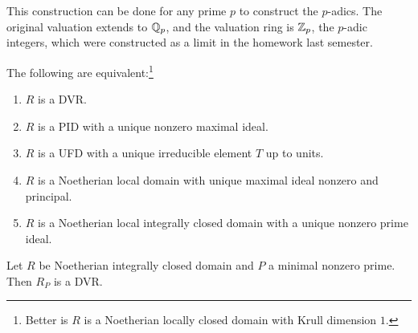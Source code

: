 \documentclass[10pt, twoside]{article}
\begin{document}
        \begin{rmk}
            This construction can be done for any prime $p$ to construct the $p$-adics. The original valuation extends to $\mathbb{Q}_p$, and the valuation ring is $\mathbb{Z}_p$, the $p$-adic integers, which were constructed as a limit in the homework last semester.
        \end{rmk}

        \begin{thm}
            The following are equivalent:\footnote{Better is $R$ is a Noetherian locally closed domain with Krull dimension $1$.}
            \begin{enumerate}
                \item $R$ is a DVR.
                \item $R$ is a PID with a unique nonzero maximal ideal.
                \item $R$ is a UFD with a unique irreducible element $T$ up to units.
                \item $R$ is a Noetherian local domain with unique maximal ideal nonzero and principal.
                \item $R$ is a Noetherian local integrally closed domain with a unique nonzero prime ideal.
            \end{enumerate}
        \end{thm}
        
        \begin{prop}
            Let $R$ be Noetherian integrally closed domain and $P$ a minimal nonzero prime. Then $R_P$ is a DVR.
        \end{prop}
\end{document}
